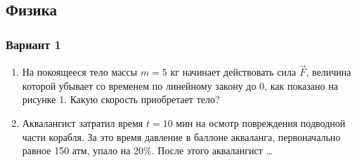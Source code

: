 \documentclass{article}
\begin{document}
\begin{paracol}{2}
\begin{flushleft}
\subsection*{Физика}
\subsubsection*{Вариант 1}
\begin{enumerate}
    \item На покоящееся тело массы $m=5$ кг начинает действовать сила $\overrightarrow{F}$, величина которой убывает со временем по линейному закону до 0, как показано на рисунке 1. Какую скорость приобретает тело?
    \item Аквалангист затратил время $t=10$ мин на осмотр повреждения подводной части корабля. За это время давление в баллоне акваланга, первоначально равное 150 атм, упало на 20\%. После этого аквалангист \ldots
\end{enumerate}

\end{flushleft}

\end{paracol}
\newpage
\end{document}
